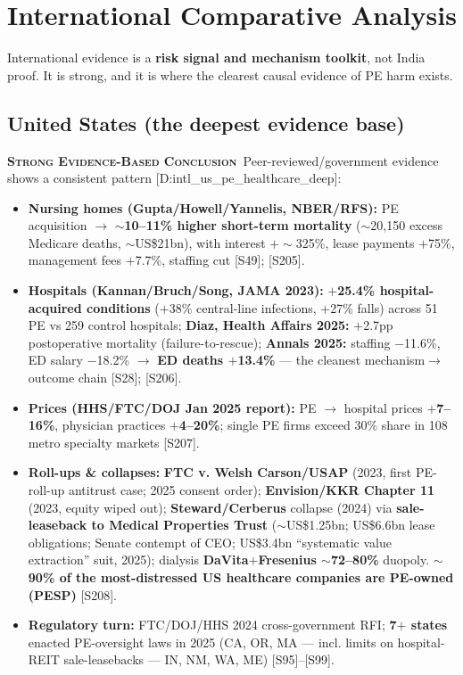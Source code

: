 \documentclass[11pt,a4paper]{article}
\newcommand{\SE}{\textcolor{secol}{\textsc{\textbf{Strong Evidence-Based Conclusion}}}}
\newcommand{\cs}[1]{\textnormal{[#1]}}
\begin{document}
\section{International Comparative Analysis}\label{sec:international}
International evidence is a \textbf{risk signal and mechanism toolkit}, not India proof. It is strong, and it is where the clearest causal evidence of PE harm exists.

\subsection{United States (the deepest evidence base)}

\SE\ Peer-reviewed/government evidence shows a consistent pattern \cs{D:intl\_us\_pe\_healthcare\_deep}:
\begin{itemize}[leftmargin=1.4em,itemsep=2pt]
\item \textbf{Nursing homes (Gupta/Howell/Yannelis, NBER/RFS):} PE acquisition $\rightarrow$ \textbf{$\sim$10--11\% higher short-term mortality} ($\sim$20{,}150 excess Medicare deaths, $\sim$US\$21bn), with interest $+\sim$325\%, lease payments $+$75\%, management fees $+$7.7\%, staffing cut \cs{S49}; \cs{S205}.
\item \textbf{Hospitals (Kannan/Bruch/Song, JAMA 2023):} \textbf{$+$25.4\% hospital-acquired conditions} ($+$38\% central-line infections, $+$27\% falls) across 51 PE vs 259 control hospitals; \textbf{Diaz, Health Affairs 2025:} $+$2.7pp postoperative mortality (failure-to-rescue); \textbf{Annals 2025:} staffing $-$11.6\%, ED salary $-$18.2\% $\rightarrow$ \textbf{ED deaths $+$13.4\%} --- the cleanest mechanism$\rightarrow$outcome chain \cs{S28}; \cs{S206}.
\item \textbf{Prices (HHS/FTC/DOJ Jan 2025 report):} PE $\rightarrow$ hospital prices \textbf{$+$7--16\%}, physician practices \textbf{$+$4--20\%}; single PE firms exceed 30\% share in 108 metro specialty markets \cs{S207}.
\item \textbf{Roll-ups \& collapses:} \textbf{FTC v. Welsh Carson/USAP} (2023, first PE-roll-up antitrust case; 2025 consent order); \textbf{Envision/KKR Chapter 11} (2023, equity wiped out); \textbf{Steward/Cerberus} collapse (2024) via \textbf{sale-leaseback to Medical Properties Trust} ($\sim$US\$1.25bn; US\$6.6bn lease obligations; Senate contempt of CEO; US\$3.4bn ``systematic value extraction'' suit, 2025); dialysis \textbf{DaVita$+$Fresenius $\sim$72--80\%} duopoly. \textbf{$\sim$90\% of the most-distressed US healthcare companies are PE-owned (PESP)} \cs{S208}.
\item \textbf{Regulatory turn:} FTC/DOJ/HHS 2024 cross-government RFI; \textbf{7$+$ states} enacted PE-oversight laws in 2025 (CA, OR, MA --- incl. limits on hospital-REIT sale-leasebacks --- IN, NM, WA, ME) \cs{S95}--\cs{S99}.
\end{itemize}
\end{document}
